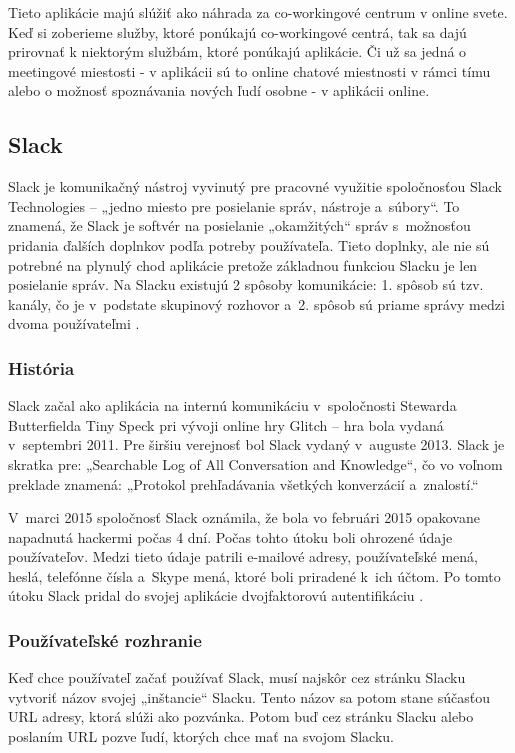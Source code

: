 \indent Tieto aplikácie majú slúžiť ako náhrada za co-workingové centrum v online svete. Keď si zoberieme služby, ktoré ponúkajú co-workingové centrá, tak sa dajú prirovnať k niektorým službám, ktoré ponúkajú aplikácie. Či už sa jedná o meetingové miestosti - v aplikácii sú to online chatové miestnosti v rámci tímu alebo o možnosť spoznávania nových ľudí osobne - v aplikácii online. 

\subsection{Slack}
\indent Slack je komunikačný nástroj vyvinutý pre pracovné využitie spoločnosťou Slack Technologies – „jedno miesto pre posielanie správ, nástroje a súbory“. To znamená, že Slack je softvér na posielanie „okamžitých“ správ s možnosťou pridania ďalších doplnkov podľa potreby používateľa. Tieto doplnky, ale nie sú potrebné na plynulý chod aplikácie pretože základnou funkciou Slacku je len posielanie správ. Na Slacku existujú 2 spôsoby komunikácie: 1. spôsob sú tzv. kanály, čo je v podstate skupinový rozhovor a 2. spôsob sú priame správy medzi dvoma používateľmi \cite{slack}. 

\subsubsection{História}
\indent Slack začal ako aplikácia na internú komunikáciu v spoločnosti Stewarda Butterfielda Tiny Speck pri vývoji online hry Glitch – hra bola vydaná v septembri 2011. Pre širšiu verejnosť bol Slack vydaný v auguste 2013. Slack je skratka pre: „Searchable Log of All Conversation and Knowledge“, čo vo voľnom preklade znamená: „Protokol prehľadávania všetkých konverzácií a znalostí.“

\indent V marci 2015 spoločnosť Slack oznámila, že bola vo februári 2015 opakovane napadnutá hackermi počas 4 dní. Počas tohto útoku boli ohrozené údaje používateľov. Medzi tieto údaje patrili e-mailové adresy, používateľské mená, heslá, telefónne čísla a Skype mená, ktoré boli priradené k ich účtom. Po tomto útoku Slack pridal do svojej aplikácie dvojfaktorovú autentifikáciu \cite{slack}. 

\subsubsection{Používateľské rozhranie}
\indent Keď chce používateľ začať používať Slack, musí najskôr cez stránku Slacku vytvoriť názov svojej „inštancie“ Slacku. Tento názov sa potom stane súčasťou URL adresy, ktorá slúži ako pozvánka. Potom buď cez stránku Slacku alebo poslaním URL pozve ľudí, ktorých chce mať na svojom Slacku. 

